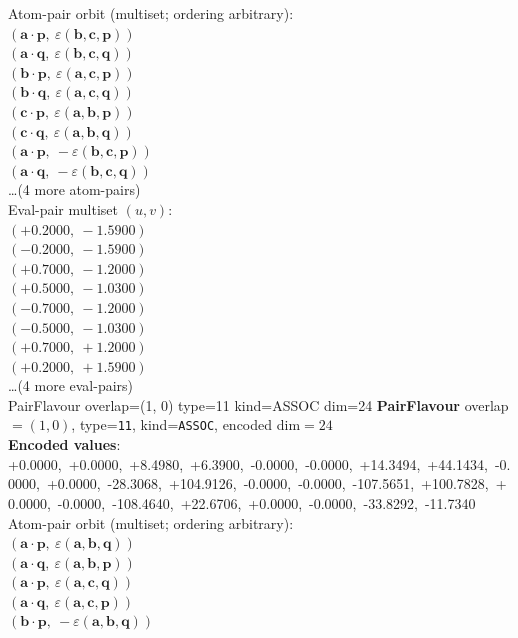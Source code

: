 \documentclass[a4paper,11pt]{article}
\newcommand{\pdcegfomjfhook}[2]{\mathbf{#1} \cdot \mathbf{#2}}
\newcommand{\kblbmcpggoncpf}[3]{\varepsilon(\mathbf{#1},\mathbf{#2},\mathbf{#3})}
\begin{document}
\quad Atom-pair orbit (multiset; ordering arbitrary):\\
$(\pdcegfomjfhook{a}{p},\ \kblbmcpggoncpf{b}{c}{p})$\\
$(\pdcegfomjfhook{a}{q},\ \kblbmcpggoncpf{b}{c}{q})$\\
$(\pdcegfomjfhook{b}{p},\ \kblbmcpggoncpf{a}{c}{p})$\\
$(\pdcegfomjfhook{b}{q},\ \kblbmcpggoncpf{a}{c}{q})$\\
$(\pdcegfomjfhook{c}{p},\ \kblbmcpggoncpf{a}{b}{p})$\\
$(\pdcegfomjfhook{c}{q},\ \kblbmcpggoncpf{a}{b}{q})$\\
$(\pdcegfomjfhook{a}{p},\ -\kblbmcpggoncpf{b}{c}{p})$\\
$(\pdcegfomjfhook{a}{q},\ -\kblbmcpggoncpf{b}{c}{q})$\\
\quad \ldots (4 more atom-pairs)\\
\quad Eval-pair multiset $(u, v)$:\\
$(+0.2000,\ -1.5900)$\\
$(-0.2000,\ -1.5900)$\\
$(+0.7000,\ -1.2000)$\\
$(+0.5000,\ -1.0300)$\\
$(-0.7000,\ -1.2000)$\\
$(-0.5000,\ -1.0300)$\\
$(+0.7000,\ +1.2000)$\\
$(+0.2000,\ +1.5900)$\\
\quad \ldots (4 more eval-pairs)\\
    PairFlavour  overlap=(1, 0)  type=11  kind=ASSOC  dim=24
\textbf{PairFlavour} overlap$=(1, 0)$, type=\texttt{11}, kind=\texttt{ASSOC}, encoded dim$=24$\\
\textbf{      Encoded values}: +0.0000,\ +0.0000,\ +8.4980,\ +6.3900,\ -0.0000,\ -0.0000,\ +14.3494,\ +44.1434,\ -0.0000,\ +0.0000,\ -28.3068,\ +104.9126,\ -0.0000,\ -0.0000,\ -107.5651,\ +100.7828,\ +0.0000,\ -0.0000,\ -108.4640,\ +22.6706,\ +0.0000,\ -0.0000,\ -33.8292,\ -11.7340\\
\quad Atom-pair orbit (multiset; ordering arbitrary):\\
$(\pdcegfomjfhook{a}{p},\ \kblbmcpggoncpf{a}{b}{q})$\\
$(\pdcegfomjfhook{a}{q},\ \kblbmcpggoncpf{a}{b}{p})$\\
$(\pdcegfomjfhook{a}{p},\ \kblbmcpggoncpf{a}{c}{q})$\\
$(\pdcegfomjfhook{a}{q},\ \kblbmcpggoncpf{a}{c}{p})$\\
$(\pdcegfomjfhook{b}{p},\ -\kblbmcpggoncpf{a}{b}{q})$\\
\end{document}
